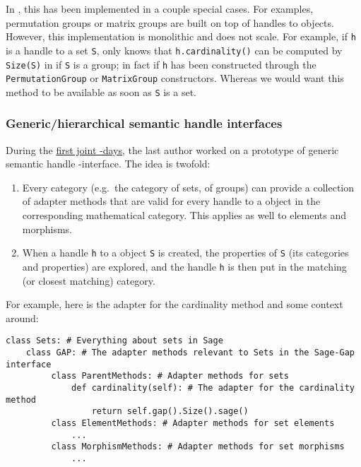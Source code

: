In \Sage, this has been implemented in a couple special cases. For
examples, \Sage permutation groups or matrix groups are built on top
of handles to \GAP objects. However, this implementation is monolithic
and does not scale. For example, if \texttt{h} is a handle to a set
\texttt{S}, \Sage only knows that \texttt{h.cardinality()} can be
computed by \texttt{Size(S)} in \GAP if \texttt{S} is a group; in fact
if \texttt{h} has been constructed through the
\texttt{PermutationGroup} or \texttt{MatrixGroup}
constructors. Whereas we would want this method to be available as
soon as \texttt{S} is a set.

\subsubsection{Generic/hierarchical semantic handle interfaces}\label{generichierarchical-semantic-handle-interfaces}

During the \href{http://gapdays.de/gap-sage-days2016/}{first joint
  \GAP-\Sage days}, the last author worked on a prototype of generic
semantic handle \Sage-\GAP interface. The idea is twofold:

\begin{enumerate}
\def\labelenumi{\arabic{enumi}.}
\item Every \Sage category (e.g.~the category of sets, of groups) can
  provide a collection of adapter methods that are valid for every
  handle to a \GAP object in the corresponding mathematical category.
  This applies as well to elements and morphisms.
\item When a handle \texttt{h} to a \GAP object \texttt{S} is created,
  the properties of \texttt{S} (its \GAP categories and properties)
  are explored, and the handle \texttt{h} is then put in the matching
  (or closest matching) \Sage category.
\end{enumerate}

For example, here is the adapter for the cardinality method and some
context around:
\begin{lstlisting}
class Sets: # Everything about sets in Sage
    class GAP: # The adapter methods relevant to Sets in the Sage-Gap interface
         class ParentMethods: # Adapter methods for sets
             def cardinality(self): # The adapter for the cardinality method
                 return self.gap().Size().sage()
         class ElementMethods: # Adapter methods for set elements
             ...
         class MorphismMethods: # Adapter methods for set morphisms
             ...
\end{lstlisting}

